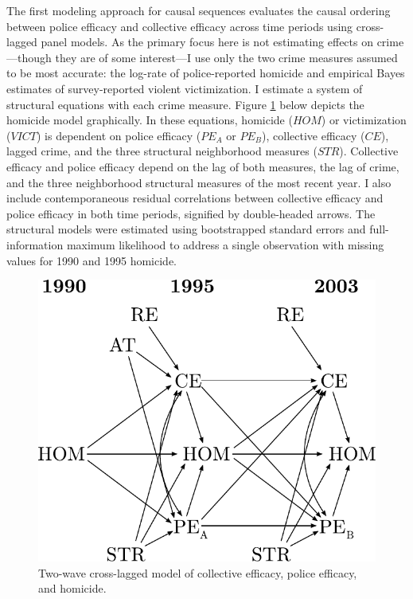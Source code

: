\documentclass [11pt, proquest] {uwthesis}[2015/03/03]
\begin{document}
The first modeling approach for causal sequences evaluates the causal ordering between police efficacy and collective efficacy across time periods using cross-lagged panel models. As the primary focus here is not estimating effects on crime---though they are of some interest---I use only the two crime measures assumed to be most accurate: the log-rate of police-reported homicide and empirical Bayes estimates of survey-reported violent victimization. I estimate a system of structural equations with each crime measure. Figure \ref{fig:crosslagmodel} below depicts the homicide model graphically. In these equations, homicide (\(HOM\)) or victimization (\(VICT\)) is dependent on police efficacy (\(PE_A\) or \(PE_B\)), collective efficacy (\(CE\)), lagged crime, and the three structural neighborhood measures (\(STR\)). Collective efficacy and police efficacy depend on the lag of both measures, the lag of crime, and the three neighborhood structural measures of the most recent year. I also include contemporaneous residual correlations between collective efficacy and police efficacy in both time periods, signified by double-headed arrows. The structural models were estimated using bootstrapped standard errors and full-information maximum likelihood to address a single observation with missing values for 1990 and 1995 homicide.\linebreak
\linebreak
\begin{figure}

{\centering \includegraphics[width=0.6\linewidth]{./figure/ch3/crosslag_model} 

}

\caption{Two-wave cross-lagged model of collective efficacy, police efficacy, and homicide.}\label{fig:crosslagmodel}
\end{figure}
\end{document}
